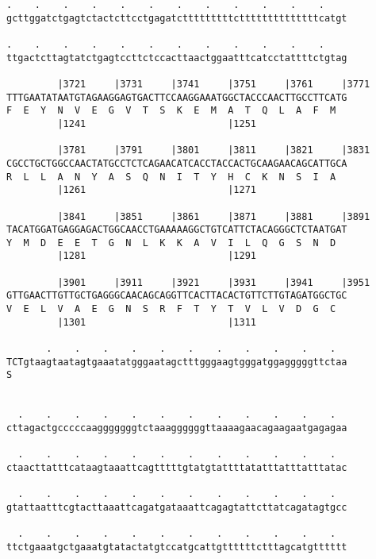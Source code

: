 \documentclass{article}
\begin{document}
\begin{Verbatim}
.    .    .    .    .    .    .    .    .    .    .    .    
gcttggatctgagtctactcttcctgagatctttttttttcttttttttttttttcatgt
                                                            
.    .    .    .    .    .    .    .    .    .    .    .    
ttgactcttagtatctgagtccttctccacttaactggaatttcatcctattttctgtag
                                                            
         |3721     |3731     |3741     |3751     |3761     |3771
TTTGAATATAATGTAGAAGGAGTGACTTCCAAGGAAATGGCTACCCAACTTGCCTTCATG
F  E  Y  N  V  E  G  V  T  S  K  E  M  A  T  Q  L  A  F  M  
         |1241                         |1251                
  
         |3781     |3791     |3801     |3811     |3821     |3831
CGCCTGCTGGCCAACTATGCCTCTCAGAACATCACCTACCACTGCAAGAACAGCATTGCA
R  L  L  A  N  Y  A  S  Q  N  I  T  Y  H  C  K  N  S  I  A  
         |1261                         |1271                
  
         |3841     |3851     |3861     |3871     |3881     |3891
TACATGGATGAGGAGACTGGCAACCTGAAAAAGGCTGTCATTCTACAGGGCTCTAATGAT
Y  M  D  E  E  T  G  N  L  K  K  A  V  I  L  Q  G  S  N  D  
         |1281                         |1291                
  
         |3901     |3911     |3921     |3931     |3941     |3951
GTTGAACTTGTTGCTGAGGGCAACAGCAGGTTCACTTACACTGTTCTTGTAGATGGCTGC
V  E  L  V  A  E  G  N  S  R  F  T  Y  T  V  L  V  D  G  C  
         |1301                         |1311                
  
       .    .    .    .    .    .    .    .    .    .    .  
TCTgtaagtaatagtgaaatatgggaatagctttgggaagtgggatggagggggttctaa
S                                                           
                                                            
  
  .    .    .    .    .    .    .    .    .    .    .    .  
cttagactgcccccaagggggggtctaaaggggggttaaaagaacagaagaatgagagaa
                                                            
  .    .    .    .    .    .    .    .    .    .    .    .  
ctaacttatttcataagtaaattcagtttttgtatgtattttatatttatttatttatac
                                                            
  .    .    .    .    .    .    .    .    .    .    .    .  
gtattaatttcgtacttaaattcagatgataaattcagagtattcttatcagatagtgcc
                                                            
  .    .    .    .    .    .    .    .    .    .    .    .  
ttctgaaatgctgaaatgtatactatgtccatgcattgttttttctttagcatgtttttt
                                                            

\end{Verbatim}
\end{document}
